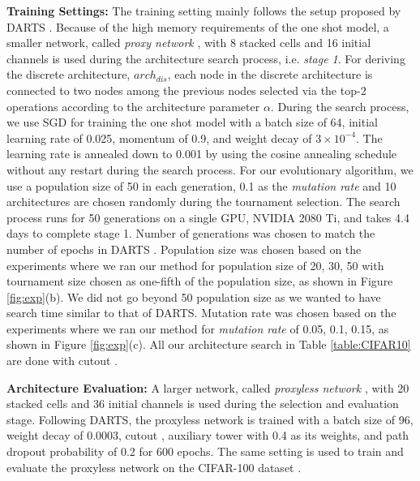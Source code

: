 \documentclass[final]{cvpr}
\begin{document}
\textbf{Training Settings:} The training setting mainly follows the setup proposed by DARTS
\cite{liu2018darts2}. Because of the high memory requirements of the one shot model, a smaller
network, called \textit{proxy network} \cite{li2019random}, with 8 stacked cells and 
16 initial channels is used during the architecture search process, i.e. \textit{stage 1}.
For deriving the discrete architecture, $arch_{dis}$, each node in the discrete architecture
is connected to two nodes among the previous nodes selected via the top-2 operations
according to the architecture parameter $\alpha$. During the search process, we use SGD for
training the one shot model with a batch size of 64, initial learning rate of 0.025, momentum of
0.9, and weight decay of $3\times10^{-4}$.  The learning rate is annealed down to 0.001 by using
the cosine annealing schedule without any restart during the search process. For our evolutionary
algorithm, we use a population size of 50 in each generation, 0.1 as the \textit{mutation rate}
and 10 architectures are chosen randomly during the tournament selection. The search process runs
for 50 generations on a single GPU, NVIDIA 2080 Ti, and takes 4.4 days to complete stage 1. Number
of generations was chosen to match the number of epochs in DARTS \cite{liu2018darts2}. Population
size was chosen based on the experiments where we ran our method for population size of 20, 30, 50
with tournament size chosen as one-fifth of the population size, as shown in Figure
\ref{fig:exp}(b). We did not go beyond 50 population size as we wanted to have search time
similar to that of DARTS. Mutation rate was chosen based on the experiments where we ran our
method for \textit{mutation rate} of 0.05, 0.1, 0.15, as shown in Figure \ref{fig:exp}(c). All our
architecture search in Table \ref{table:CIFAR10} are done with cutout \cite{devries2017improved}.

\textbf{Architecture Evaluation:} A larger network, called \textit{proxyless network} 
\cite{li2019random}, with 20 stacked cells and 36 initial channels is used during the selection
and evaluation stage. Following DARTS\cite{liu2018darts2}, the proxyless network is trained with a
batch size of 96, weight decay of 0.0003, cutout \cite{devries2017improved}, auxiliary tower with
0.4 as its weights, and path dropout probability of 0.2 for 600 epochs. The same setting is used
to train and evaluate the proxyless network on the CIFAR-100 dataset
\cite{krizhevsky2009learning}.
\end{document}

